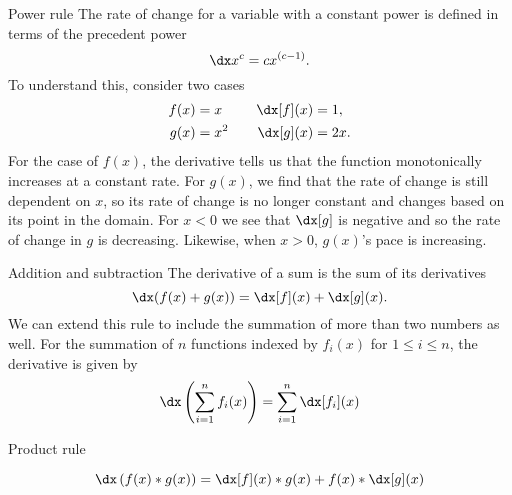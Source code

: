 \begin{psec}{Power rule}\label{rule:derivative powers} The rate of change for a variable with a constant power is defined in terms of the precedent power
    \begin{equation}\label{eq:derivative power}
        \dx x^{c} = c x^{(c - 1)}.
    \end{equation}
    To understand this, consider two cases
    \begin{align*}
        f(x) &= x &\quad \dx[f](x) &= 1,\\
        g(x) &= x^2 &\quad \dx[g](x) &= 2x.
    \end{align*}
    For the case of $f(x)$, the derivative tells us that the function monotonically increases at a constant rate. For $g(x)$, we find that the rate of change is still dependent on $x$, so its rate of change is no longer constant and changes based on its point in the domain. For $x<0$ we see that $\dx[g]$ is negative and so the rate of change in $g$ is decreasing. Likewise, when $x>0$, $g(x)$'s pace is increasing.

\end{psec}

\begin{psec}{Addition and subtraction}\label{rule:derivative add} The derivative of a sum is the sum of its derivatives
    \begin{equation}\label{eq:derivative add}
        \dx (f(x) + g(x)) = \dx[f](x) + \dx[g](x).
    \end{equation}
    We can extend this rule to include the summation of more than two numbers as well. For the summation of $n$ functions indexed by $f_i(x)$ for $1\leq i\leq n$, the derivative is given by
    \begin{equation}\label{eq:derivative n add}
        \dx\left(\sum_{i=1}^{n} f_i(x)\right) = \sum_{i=1}^{n} \dx[f_i](x)
    \end{equation}

\end{psec}

\begin{psec}{Product rule}\label{rule:derivative product}

    \begin{equation}\label{eq:derivative prod}
        \dx \left(f(x)*g(x)\right) = \dx[f](x) *  g(x) + f(x) *
        \dx[g](x)
    \end{equation}

\end{psec}


